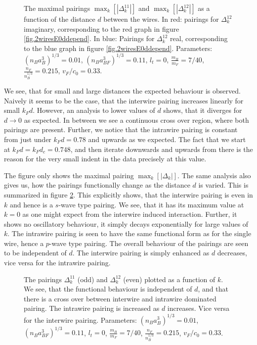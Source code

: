 \begin{figure} 
\begin{center}  
  
\caption{The maximal pairings $\max_k\left[\left|\Delta^{11}_k\right|\right]$ and $\max_k\left[\left|\Delta^{12}_k\right|\right]$ as a function of the distance $d$ between the wires. In red: pairings for $\Delta^{12}_k$ imaginary, corresponding to the red graph in figure \ref{fig.2wiresE0ddepend}. In blue: Pairings for $\Delta^{12}_k$ real, corresponding to the blue graph in figure \ref{fig.2wiresE0ddepend}. Parameters: $(n_Ba_B^3)^{1/3} = 0.01$, $(n_Ba_{BF}^3)^{1/3} = 0.11$, $l_t = 0$, $\frac{m_B}{m_F} = 7/40$, $\frac{n_F}{n_B^{1/3}} = 0.215$, $v_F/c_0 = 0.33$. }  
\label{fig.2wiresMaximalPairingddepend}  
\end{center}    
\end{figure}
 
We see, that for small and large distances the expected behaviour is observed. Naively it seems to be the case, that the interwire pairing increases linearly for small $k_Fd$. However, an analysis to lower values of $d$ shows, that it diverges for $d \to 0$ as expected. In between we see a continuous cross over region, where both pairings are present. Further, we notice that the intrawire pairing is constant from just under $k_Fd = 0.78$ and upwards as we expected. The fact that we start at $k_Fd = k_Fd_c = 0.748$, and then iterate downwards and upwards from there is the reason for the very small indent in the data precisely at this value.

The figure only shows the maximal pairing $\max_k[|\Delta_k|]$. The same analysis also gives us, how the pairings functionally change as the distance $d$ is varied. This is summarized in figure \ref{fig.pairingkdependT0dvaried}. This explicitly shows, that the interwire pairing is even in $k$ and hence is a $s$-wave type pairing. We see, that it has its maximum value at $k=0$ as one might expect from the interwire induced interaction. Further, it shows no oscillatory behaviour, it simply decays exponentially for large values of $k$. The intrawire pairing is seen to have the same functional form as for the single wire, hence a $p$-wave type pairing. The overall behaviour of the pairings are seen to be independent of $d$. The interwire pairing is simply enhanced as $d$ decreases, vice versa for the intrawire pairing.  

\begin{figure} 
\begin{center}  
  
\caption{The pairings $\Delta^{11}_k$ (odd) and $\Delta^{12}_k$ (even) plotted as a function of $k$. We see, that the functional behaviour is independent of $d$, and that there is a cross over between interwire and intrawire dominated pairing. The intrawire pairing is increased as $d$ increases. Vice versa for the interwire pairing. Parameters: $(n_Ba_B^3)^{1/3} = 0.01$, $(n_Ba_{BF}^3)^{1/3} = 0.11$, $l_t = 0$, $\frac{m_B}{m_F} = 7/40$, $\frac{n_F}{n_B^{1/3}} = 0.215$, $v_F/c_0 = 0.33$. }  
\label{fig.pairingkdependT0dvaried}  
\end{center}    
\end{figure}

